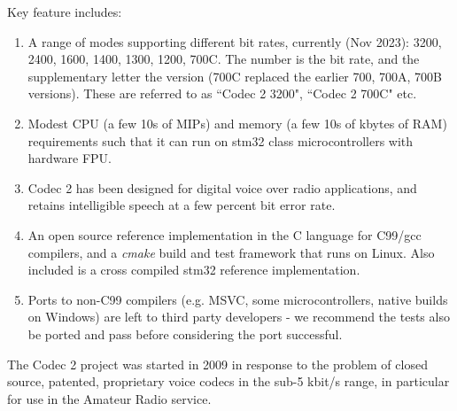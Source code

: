 \documentclass{article}
\begin{document}
Key feature includes:
\begin{enumerate}
\item A range of modes supporting different bit rates, currently (Nov 2023): 3200, 2400, 1600, 1400, 1300, 1200, 700C.  The number is the bit rate, and the supplementary letter the version (700C replaced the earlier 700, 700A, 700B versions). These are referred to as ``Codec 2 3200", ``Codec 2 700C" etc.
\item Modest CPU (a few 10s of MIPs) and memory (a few 10s of kbytes of RAM) requirements such that it can run on stm32 class microcontrollers with hardware FPU.
\item Codec 2 has been designed for digital voice over radio applications, and retains intelligible speech at a few percent bit error rate.
\item An open source reference implementation in the C language for C99/gcc compilers, and a \emph{cmake} build and test framework that runs on Linux.  Also included is a cross compiled stm32 reference implementation.
\item Ports to non-C99 compilers (e.g. MSVC, some microcontrollers, native builds on Windows) are left to third party developers - we recommend the tests also be ported and pass before considering the port successful.
\end{enumerate}

The Codec 2 project was started in 2009 in response to the problem of closed source, patented, proprietary voice codecs in the sub-5 kbit/s range, in particular for use in the Amateur Radio service.
\end{document}
